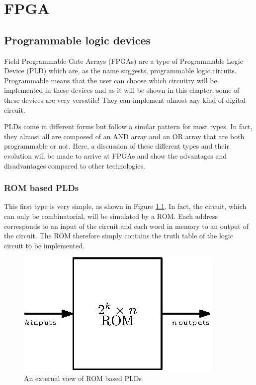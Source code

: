 \chapter{FPGA}

\section{Programmable logic devices}

Field Programmable Gate Arrays (FPGAs) are a type of Programmable Logic Device (PLD) which are, as 
the name suggests, programmable logic circuits. Programmable means that the user can choose which 
circuitry will be implemented in these devices and as it will be shown in this chapter, some of 
these devices are very versatile! They can implement almost any kind of digital circuit.

PLDs come in different forms but follow a similar pattern for most types. In fact, they almost all 
are composed of an AND array and an OR array that are both programmable or not. Here, a discussion 
of these different types and their evolution will be made to arrive at FPGAs and show the advantages 
and disadvantages compared to other technologies.

\subsection{ROM based PLDs}

This first type is very simple, as shown in Figure \ref{fig:fpga/pld_rom_external}. In fact, the 
circuit, which can only be combinatorial, will be simulated by a ROM. Each address corresponds to 
an input of the circuit and each word in memory to an output of the circuit. The ROM therefore 
simply contains the truth table of the logic circuit to be implemented.

\begin{figure}[ht]
    \centering
    \includegraphics[scale=1.2]{Chapter2-FPGA/res/pld_rom_external}
    \caption{An external view of ROM based PLDs}
    \label{fig:fpga/pld_rom_external}
\end{figure}

